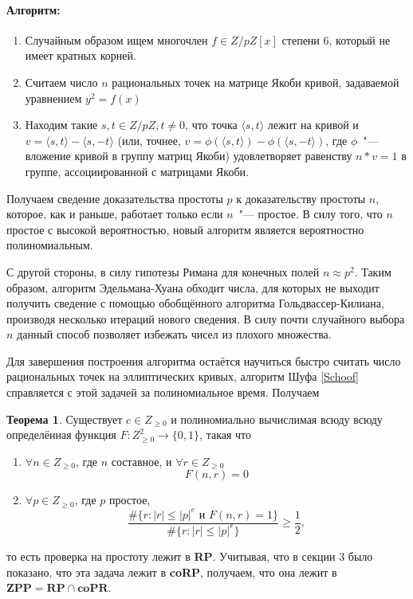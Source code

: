 \documentclass[12pt]{article}
\theoremstyle{definition}
\newtheorem{Th}{Теорема}
\numberwithin{Def}{section}
\numberwithin{Th}{section}
\numberwithin{St}{section}
\numberwithin{Cor}{section}
\begin{document}
\paragraph{Алгоритм:}
\begin{enumerate}[1)]
	\item Случайным образом ищем многочлен $f\in Z/pZ[x]$ степени 6,
который не имеет кратных корней.
	\item Считаем число $n$ рациональных точек на матрице Якоби кривой,
	задаваемой уравнением $y^2=f(x)$
	\item Находим такие $s,t\in Z/pZ, t\neq0$, что точка $\langle s,t \rangle$
	лежит на кривой и ${v=\langle s,t\rangle-\langle s,-t \rangle}$ (или, точнее,
	${v=\phi(\langle s,t\rangle)-\phi(\langle s,-t \rangle)}$, где $\phi$~"---
	вложение кривой в группу матриц Якоби) удовлетворяет равенству $n*v=1$ в 
	группе, ассоциированной с матрицами Якоби.
\end{enumerate}

Получаем сведение доказательства простоты $p$ к доказательству простоты $n$,
которое, как и раньше, работает только если $n$~"--- простое. В силу того,
что $n$ простое с высокой вероятностью, новый алгоритм является вероятностно
полиномиальным.

С другой стороны, в силу гипотезы Римана для конечных полей $n\approx p^2$.
Таким образом, алгоритм Эдельмана-Хуана обходит числа, для которых не выходит
получить сведение с помощью обобщённого алгоритма Гольдвассер-Килиана, производя
несколько итераций нового сведения. В силу почти случайного выбора $n$ данный
способ позволяет избежать чисел из плохого множества.

Для завершения построения алгоритма остаётся научиться быстро считать число
рациональных точек на эллиптических кривых, алгоритм Шуфа \ref{Schoof}
справляется с этой задачей за полиномиальное время. Получаем

\begin{Th}
	Существует $c\in Z_{\geqslant 0}$ и полиномиально вычислимая всюду
	всюду определённая функция $F:Z^2_{\geqslant 0}\to \{0,1\}$, такая что
	\begin{enumerate}
		\item $\forall n\in Z_{\geqslant 0}$, где $n$ составное, и
		$\forall r\in Z_{\geqslant 0}$
		$$
		F(n,r)=0
		$$
		\item $\forall p\in Z_{\geqslant 0}$, где $p$ простое,
		$$
		\dfrac{\#\{r:|r|\leqslant|p|^e\text{ и }F(n,r)=1\}}
		{\#\{r:|r|\leqslant|p|^e\}}\geqslant\dfrac 12,
		$$
	\end{enumerate}
	то есть проверка на простоту лежит в \textbf{RP}. Учитывая, что в секции 3
	было показано, что эта задача лежит в \textbf{coRP}, получаем, что она лежит
	в $\mathbf{ZPP=RP\cap coPR}$.
\end{Th}
\end{document}
